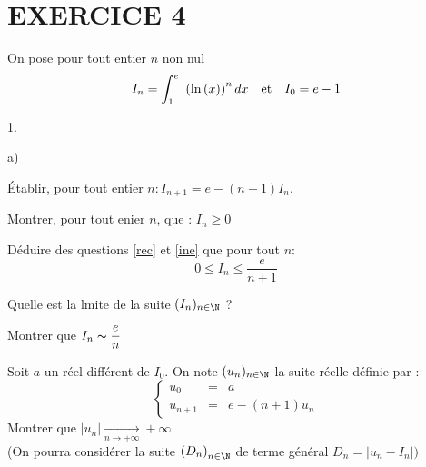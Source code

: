 \documentclass[11pt]{article}%
\begin{document}
\section*{EXERCICE 4}

On pose pour tout entier $n$ non nul 
\[
I_{n} = \displaystyle \int_{1}^{e}\ \left( \ln \left( x\right) \right) ^{n}dx\quad 
\text{et\quad }I_{0} = e-1
\]

\begin{noliste}{1.}
 \setlength{\itemsep}{4mm}
\item 

\begin{noliste}{a)}
 \setlength{\itemsep}{2mm}
\item \label{rec}Établir, pour tout entier $n :I_{n + 1} = e-(n +
1)I_{n}$.

\item \label{ine}Montrer, pour tout enier $n$, que : $I_{n}\geq 0$

\item Déduire des questions \ref{rec} et \ref{ine} que pour tout $n :$
\[
0\leq I_{n}\leq \frac{e}{n + 1}
\]

\item Quelle est la lmite de la suite $(I_{n})_{n\in \N}$ ?

\item Montrer que $I_{n}\thicksim \dfrac{e}{n}$
\end{noliste}

\item Soit $a$ un réel différent de $I_{0}$. On note $(u_{n})_{n\in
\N}$ la suite réelle définie par : 
\[
\left\{ 
\begin{array}{ccc}
u_{0} & = & a \\
u_{n + 1} & = & e-\left( n + 1\right) u_{n}
\end{array}
\right.
\]
Montrer que $\left| u_{n}\right| \underset{n\rightarrow + \infty
}{\rightarrow } + \infty $\\
(On pourra considérer la suite $\left( D_{n}\right)_{n\in \N}$ de
terme général $D_{n} = \left| u_{n}-I_{n}\right| )$
\end{noliste}

\label{fin}
\end{document}
